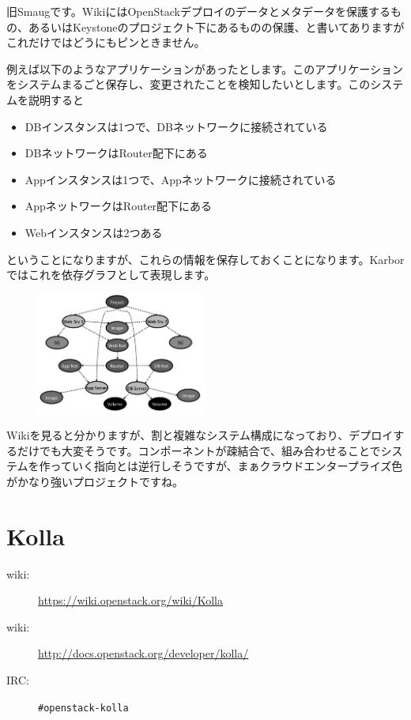 旧Smaugです。WikiにはOpenStackデプロイのデータとメタデータを保護するもの、あるいはKeystoneのプロジェクト下にあるものの保護、と書いてありますがこれだけではどうにもピンときません。

例えば以下のようなアプリケーションがあったとします。このアプリケーションをシステムまるごと保存し、変更されたことを検知したいとします。このシステムを説明すると

\begin{itemize}
	\item DBインスタンスは1つで、DBネットワークに接続されている
	\item DBネットワークはRouter配下にある
	\item Appインスタンスは1つで、Appネットワークに接続されている
	\item AppネットワークはRouter配下にある
	\item Webインスタンスは2つある
\end{itemize}

ということになりますが、これらの情報を保存しておくことになります。Karborではこれを依存グラフとして表現します。

\begin{figure}
	\vspace*{-2\intextsep}
	\begin{center}
		\includegraphics[width=0.5\textwidth]{img/Smaug-dependency-graph.png}
	\end{center}
\end{figure}

Wikiを見ると分かりますが、割と複雑なシステム構成になっており、デプロイするだけでも大変そうです。コンポーネントが疎結合で、組み合わせることでシステムを作っていく指向とは逆行しそうですが、まぁクラウドエンタープライズ色がかなり強いプロジェクトですね。

\section{Kolla}

\begin{description}
	\item[wiki:] \url{https://wiki.openstack.org/wiki/Kolla}
	\item[wiki:] \url{http://docs.openstack.org/developer/kolla/}
	\item[IRC:] \verb|#openstack-kolla|
\end{description}

